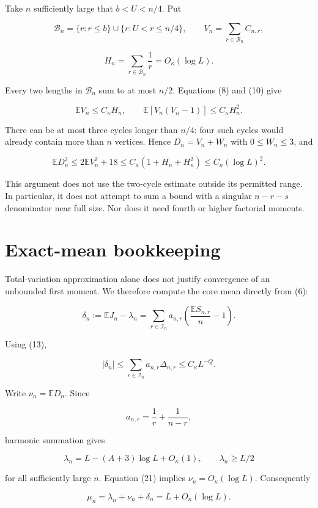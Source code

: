 \documentclass[
  11pt,
]{article}
\begin{document}
Take \(n\) sufficiently large that \(b<U<n/4\). Put

\[
 \mathcal B_n=\{r:r\le b\}\cup\{r:U<r\le n/4\},
 \qquad V_n=\sum_{r\in\mathcal B_n}C_{n,r},
\]

\[
 H_n=\sum_{r\in\mathcal B_n}\frac1r=O_\kappa(\log L).
\]

Every two lengths in \(\mathcal B_n\) sum to at most \(n/2\). Equations
(8) and (10) give

\[
 \mathbb EV_n\le C_\kappa H_n,\qquad
 \mathbb E[V_n(V_n-1)]\le C_\kappa H_n^2.
\tag{20}
\]

There can be at most three cycles longer than \(n/4\): four such cycles
would already contain more than \(n\) vertices. Hence \(D_n=V_n+W_n\)
with \(0\le W_n\le3\), and

\[
 \mathbb ED_n^2\le2\mathbb EV_n^2+18
 \le C_\kappa(1+H_n+H_n^2)
 \le C_\kappa(\log L)^2.
\tag{21}
\]

This argument does not use the two-cycle estimate outside its permitted
range. In particular, it does not attempt to sum a bound with a singular
\(n-r-s\) denominator near full size. Nor does it need fourth or higher
factorial moments.

\section{Exact-mean bookkeeping}\label{exact-mean-bookkeeping}

Total-variation approximation alone does not justify convergence of an
unbounded first moment. We therefore compute the core mean directly from
(6):

\[
 \delta_n:=\mathbb EJ_n-\lambda_n
 =\sum_{r\in\mathcal I_n}a_{n,r}
 \left(\frac{\mathbb ES_{n,r}}n-1\right).
\]

Using (13),

\[
 |\delta_n|\le\sum_{r\in\mathcal I_n}a_{n,r}\Delta_{n,r}
 \le C_\kappa L^{-Q}.
\tag{22}
\]

Write \(\nu_n=\mathbb ED_n\). Since

\[
 a_{n,r}=\frac1r+\frac1{n-r},
\]

harmonic summation gives

\[
 \lambda_n=L-(A+3)\log L+O_\kappa(1),\qquad
 \lambda_n\ge L/2
\tag{23}
\]

for all sufficiently large \(n\). Equation (21) implies
\(\nu_n=O_\kappa(\log L)\). Consequently

\[
 \mu_n=\lambda_n+\nu_n+\delta_n
 =L+O_\kappa(\log L).
\tag{24}
\]
\end{document}
